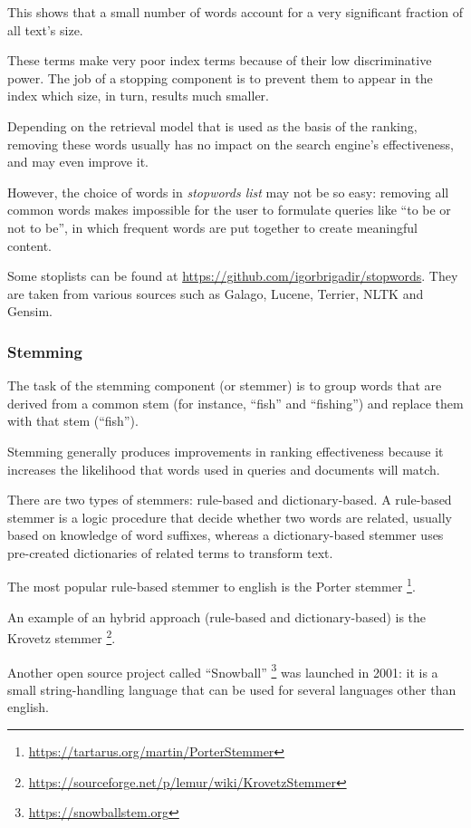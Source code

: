 This shows that a small number of words account for a very significant fraction of all text's size.

These terms make very poor index terms because of their low discriminative power. The job of a stopping component is to prevent them to appear in the index which size, in turn, results much smaller.

Depending on the retrieval model that is used as the basis of the ranking, removing these words usually has no impact on the search engine's effectiveness, and may even improve it.

However, the choice of words in \textit{stopwords list} may not be so easy: removing all common words makes impossible for the user to formulate queries like ``to be or not to be'', in which frequent words are put together to create meaningful content.

Some stoplists can be found at \url{https://github.com/igorbrigadir/stopwords}. They are taken from various sources such as Galago, Lucene, Terrier, NLTK and Gensim.

\subsubsection{Stemming}

The task of the stemming component (or stemmer) is to group words that are derived from a common stem (for instance, ``fish'' and ``fishing'') and replace them with that stem (``fish'').

Stemming generally produces improvements in ranking effectiveness because it increases the likelihood that words used in queries and documents will match.

There are two types of stemmers: rule-based and dictionary-based. A rule-based stemmer is a logic procedure that decide whether two words are related, usually based on knowledge of word suffixes, whereas a dictionary-based stemmer uses pre-created dictionaries of related terms to transform text.

The most popular rule-based stemmer to english is the Porter stemmer \footnote{\url{https://tartarus.org/martin/PorterStemmer}}.

An example of an hybrid approach (rule-based and dictionary-based) is the Krovetz stemmer \footnote{\url{https://sourceforge.net/p/lemur/wiki/KrovetzStemmer}}.

Another open source project called ``Snowball'' \footnote{\url{https://snowballstem.org}} was launched in 2001: it is a small string-handling language that can be used for several languages other than english.

